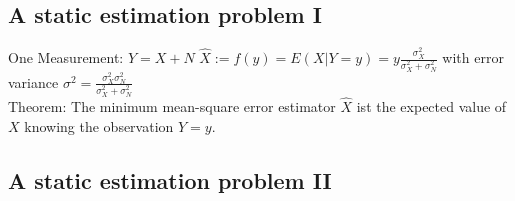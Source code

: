\subsection{A static estimation problem I }

One Measurement: $\boxed{Y=X+N}$	
\quad $\boxed{\hat{X}:=f(y)=E(X|Y=y) = y \frac{\sigma_X^2}{\sigma_X^2+\sigma_N^2}}$ 
with error variance $\boxed{\sigma^2=\frac{\sigma_{X}^2 \sigma_{N}^2}{\sigma_{X}^2 + \sigma_{N}^2}}$\\


Theorem: The minimum mean-square error estimator $\hat{X}$ ist the expected value of $X$ knowing the observation $Y=y$.

\subsection{A static estimation problem II }

